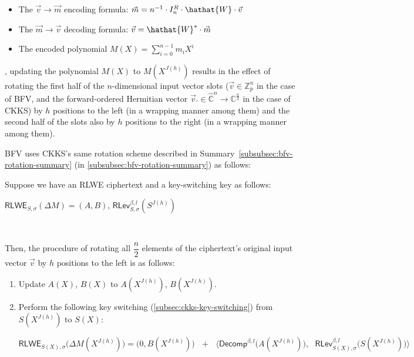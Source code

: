 \begin{itemize}
    \item The $\vec{v} \rightarrow \vec{m}$ encoding formula: $\vec{m} = n^{-1}\cdot I_n^R\cdot \hathat{W}\cdot \vec{v}$
    \item The $\vec{m} \rightarrow \vec{v}$ decoding formula: $\vec{v} = \hathat{W}^* \cdot \vec{m}$
    \item The encoded polynomial $M(X) = \sum\limits_{i=0}^{n-1}m_iX^i$
\end{itemize}    

, updating the polynomial $M(X)$ to $M(X^{J(h)})$ results in the effect of rotating the first half of the $n$-dimensional input vector slots ($\vec{v} \in \mathbb{Z}^n_p$ in the case of BFV, and the forward-ordered Hermitian vector $\vec{v}_{'} \in \mathbb{\hat C}^{n} \rightarrow \mathbb{C}^{\frac{n}{2}}$ in the case of CKKS) by $h$ positions to the left (in a wrapping manner among them) and the second half of the slots also by $h$ positions to the right (in a wrapping manner among them). 

BFV uses CKKS's same rotation scheme described in Summary~\ref*{subsubsec:bfv-rotation-summary} (in \autoref{subsubsec:bfv-rotation-summary}) as follows: 


\begin{tcolorbox}[title={\textbf{\tboxlabel{\ref*{subsec:ckks-rotation}} CKKS's Homomorphic Rotation of Input Vector Slots}}]



Suppose we have an RLWE ciphertext and a key-switching key as follows:

$\textsf{RLWE}_{S, \sigma}(\Delta M) = (A, B)$, \text{ } $\textsf{RLev}_{S, \sigma}^{\beta, l}(S^{J(h)})$

$ $

Then, the procedure of rotating all $\dfrac{n}{2}$ elements of the ciphertext's original input vector $\vec{v}$ by $h$ positions to the left is as follows: 

\begin{enumerate}
\item Update $A(X)$, $B(X)$ to $A(X^{J(h)})$, $B(X^{J(h)})$. 
\item Perform the following key switching (\autoref{subsec:ckks-key-switching}) from $S(X^{J(h)})$ to $S(X)$:


$\textsf{RLWE}_{S(X),\sigma}\bm{(}\Delta M(X^{J(h)})\bm{)} = \bm{(} 0, B(X^{J(h)}) \bm{)} \text{ } + \text{ } \bm{\langle}  \textsf{Decomp}^{\beta, l}\bm{(}A(X^{J(h)})\bm{)}, \text{ } \textsf{RLev}_{S(X), \sigma}^{\beta, l}\bm{(}S(X^{J(h)})\bm{)} \bm{\rangle}$
\end{enumerate}

\end{tcolorbox}

